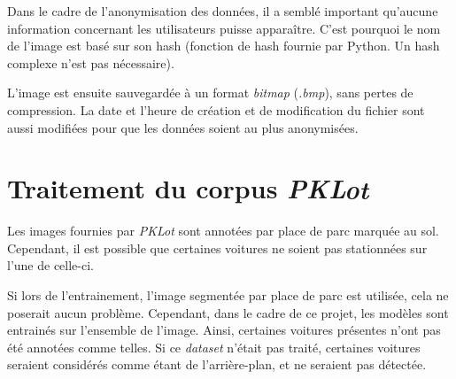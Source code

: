 Dans le cadre de l'anonymisation des données, il a semblé important qu'aucune information concernant les utilisateurs puisse apparaître. C'est pourquoi le nom de l'image est basé sur son hash (fonction de hash fournie par Python. Un hash complexe n'est pas nécessaire). 

L'image est ensuite sauvegardée à un format \textit{bitmap} (\textit{.bmp}), sans pertes de compression. La date et l'heure de création et de modification du fichier sont aussi modifiées pour que les données soient au plus anonymisées.

\section{Traitement du corpus \textit{PKLot}} \label{realisation.dataset}

Les images fournies par \textit{PKLot} sont annotées par place de parc marquée au sol. Cependant, il est possible que certaines voitures ne soient pas stationnées sur l'une de celle-ci. 

Si lors de l'entrainement, l'image segmentée par place de parc est utilisée, cela ne poserait aucun problème. Cependant, dans le cadre de ce projet, les modèles sont entrainés sur l'ensemble de l'image. Ainsi, certaines voitures présentes n'ont pas été annotées comme telles. Si ce \textit{dataset} n'était pas traité, certaines voitures seraient considérés comme étant de l'arrière-plan, et ne seraient pas détectée. 


